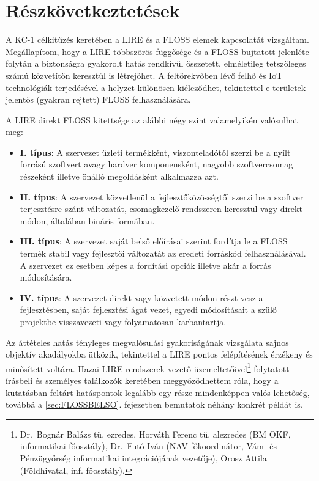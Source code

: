 \documentclass[12pt,magyar,a4paper,oneside]{scrreprt}
\providecommand{\tightlist}{%
  \setlength{\itemsep}{0pt}\setlength{\parskip}{0pt}}
\begin{document}
\hypertarget{ruxe9szkuxf6vetkeztetuxe9sek}{%
\section{Részkövetkeztetések}\label{ruxe9szkuxf6vetkeztetuxe9sek}}

A KC-1 célkitűzés keretében a LIRE és a FLOSS elemek kapcsolatát
vizsgáltam. Megállapítom, hogy a LIRE többszörös függősége és a FLOSS
bujtatott jelenléte folytán a biztonságra gyakorolt hatás rendkívül
összetett, elméletileg tetszőleges számú közvetítőn keresztül is
létrejöhet. A feltörekvőben lévő felhő és IoT technológiák terjedésével
a helyzet különösen kiéleződhet, tekintettel e területek jelentős
(gyakran rejtett) FLOSS felhasználására.

A LIRE direkt FLOSS kitettsége az alábbi négy szint valamelyikén
valósulhat meg:

\begin{itemize}
\tightlist
\item
  \textbf{I. típus}: A szervezet üzleti termékként, viszonteladótól
  szerzi be a nyílt forrású szoftvert avagy hardver komponensként,
  nagyobb szoftvercsomag részeként illetve önálló megoldásként
  alkalmazza azt.
\item
  \textbf{II. típus}: A szervezet közvetlenül a fejlesztőközösségtől
  szerzi be a szoftver terjesztésre szánt változatát, csomagkezelő
  rendszeren keresztül vagy direkt módon, általában bináris formában.
\item
  \textbf{III. típus}: A szervezet saját belső előírásai szerint
  fordítja le a FLOSS termék stabil vagy fejlesztői változatát az
  eredeti forráskód felhasználásával. A szervezet ez esetben képes a
  fordítási opciók illetve akár a forrás módosítására.
\item
  \textbf{IV. típus}: A szervezet direkt vagy közvetett módon részt vesz
  a fejlesztésben, saját fejlesztési ágat vezet, egyedi módosításait a
  szülő projektbe visszavezeti vagy folyamatosan karbantartja.
\end{itemize}

Az áttételes hatás tényleges megvalósulási gyakoriságának vizsgálata
sajnos objektív akadályokba ütközik, tekintettel a LIRE pontos
felépítésének érzékeny és minősített voltára. Hazai LIRE rendszerek
vezető üzemeltetőivel\footnote{Dr.~Bognár Balázs tü. ezredes, Horváth
  Ferenc tü. alezredes (BM OKF, informatikai főosztály), Dr.~Futó Iván
  (NAV főkoordinátor, Vám- és Pénzügyőrség informatikai integrációjának
  vezetője), Orosz Attila (Földhivatal, inf. főosztály).} folytatott
írásbeli és személyes találkozók keretében meggyőzödhettem róla, hogy a
kutatásban feltárt hatáspontok legalább egy része mindenképpen valós
lehetőség, továbbá a \ref{sec:FLOSSBELSO}. fejezetben bemutatok néhány
konkrét példát is.
\end{document}
